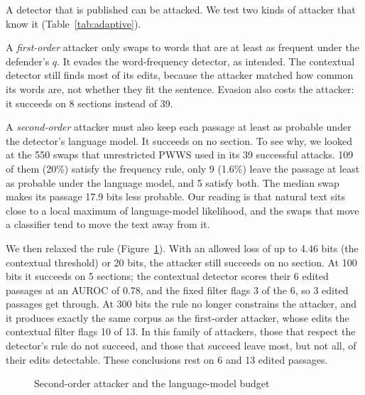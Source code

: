 \documentclass[10pt,journal,compsoc]{IEEEtran}
\begin{document}
A detector that is published can be attacked. We test two kinds of attacker that know it (Table~\ref{tab:adaptive}).

A \emph{first-order} attacker only swaps to words that are at least as frequent under the defender's $q$. It evades the word-frequency detector, as intended. The contextual detector still finds most of its edits, because the attacker matched how common its words are, not whether they fit the sentence. Evasion also costs the attacker: it succeeds on 8 sections instead of 39.

A \emph{second-order} attacker must also keep each passage at least as probable under the detector's language model. It succeeds on no section. To see why, we looked at the 550 swaps that unrestricted PWWS used in its 39 successful attacks. 109 of them (20\%) satisfy the frequency rule, only 9 (1.6\%) leave the passage at least as probable under the language model, and 5 satisfy both. The median swap makes its passage 17.9 bits less probable. Our reading is that natural text sits close to a local maximum of language-model likelihood, and the swaps that move a classifier tend to move the text away from it.

We then relaxed the rule (Figure~\ref{fig:budget}). With an allowed loss of up to 4.46 bits (the contextual threshold) or 20 bits, the attacker still succeeds on no section. At 100 bits it succeeds on 5 sections; the contextual detector scores their 6 edited passages at an AUROC of 0.78, and the fixed filter flags 3 of the 6, so 3 edited passages get through. At 300 bits the rule no longer constrains the attacker, and it produces exactly the same corpus as the first-order attacker, whose edits the contextual filter flags 10 of 13. In this family of attackers, those that respect the detector's rule do not succeed, and those that succeed leave most, but not all, of their edits detectable. These conclusions rest on 6 and 13 edited passages.

\begin{figure}[t]
\centering
{}
\caption{Second-order attacker and the language-model budget}\label{fig:budget}
\end{figure}
\end{document}
